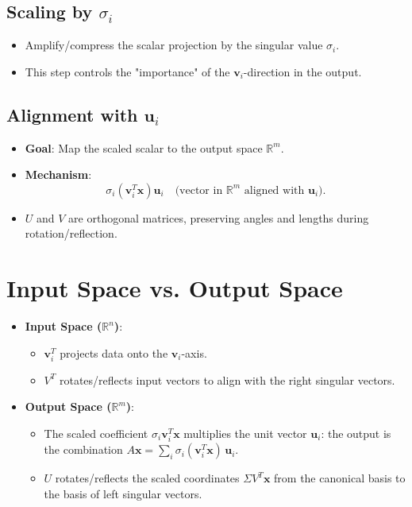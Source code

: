 \begin{notechapter}
\subsection{Scaling by \( \sigma_i \)} 
\begin{itemize}
    \item Amplify/compress the scalar projection by the singular value \( \sigma_i \).
    \item This step controls the "importance" of the \( \mathbf{v}_i \)-direction in the output.
\end{itemize}

\subsection{Alignment with \( \mathbf{u}_i \)} 
\begin{itemize}
    \item \textbf{Goal}: Map the scaled scalar to the output space \( \mathbb{R}^m \).
    \item \textbf{Mechanism}: 
    \[
    \sigma_i (\mathbf{v}_i^T \mathbf{x}) \mathbf{u}_i \quad \text{(vector in } \mathbb{R}^m \text{ aligned with } \mathbf{u}_i \text{)}.
    \]
    \item \( U \) and \( V \) are orthogonal matrices, preserving angles and lengths during rotation/reflection.
\end{itemize}

\section{Input Space vs. Output Space}
\begin{itemize}
    \item \textbf{Input Space (\( \mathbb{R}^n \))}: 
    \begin{itemize}
        \item \( \mathbf{v}_i^T \) projects data onto the \( \mathbf{v}_i \)-axis.
        \item \( V^T \) rotates/reflects input vectors to align with the right singular vectors.
    \end{itemize}
    \item \textbf{Output Space (\( \mathbb{R}^m \))}: 
    \begin{itemize}
                \item The scaled coefficient \( \sigma_i \mathbf{v}_i^T\mathbf{x} \) multiplies the unit vector \( \mathbf{u}_i \): the output is the combination \( A\mathbf{x} = \sum_i \sigma_i (\mathbf{v}_i^T\mathbf{x})\, \mathbf{u}_i \).
        \item \( U \) rotates/reflects the scaled coordinates \( \Sigma V^T \mathbf{x} \) from the canonical basis to the basis of left singular vectors.
    \end{itemize}
\end{itemize}


\end{notechapter}
